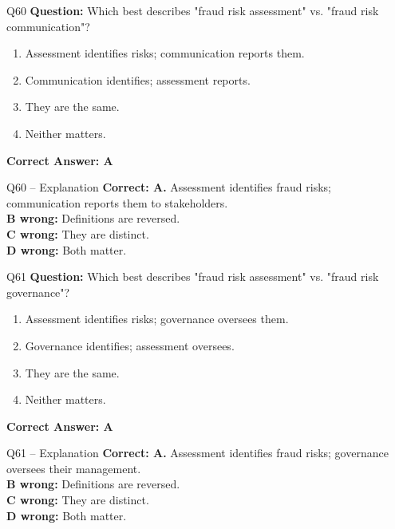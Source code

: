 \documentclass[aspectratio=169,10pt]{beamer}
\begin{document}
	\begin{frame}[t]{Q60}
		\small
		\textbf{Question:} Which best describes "fraud risk assessment" vs. "fraud risk communication"?
		\begin{enumerate}[label=\Alph*.,itemsep=1pt,topsep=2pt]
			\item Assessment identifies risks; communication reports them.
			\item Communication identifies; assessment reports.
			\item They are the same.
			\item Neither matters.
		\end{enumerate}
		\vspace{4pt}
		\textbf{Correct Answer: A}
	\end{frame}
	
	\begin{frame}[t]{Q60 -- Explanation}
		\small
		\textbf{Correct: A.} Assessment identifies fraud risks; communication reports them to stakeholders. \\[4pt]
		\textbf{B wrong:} Definitions are reversed. \\[2pt]
		\textbf{C wrong:} They are distinct. \\[2pt]
		\textbf{D wrong:} Both matter.
	\end{frame}
	
	\begin{frame}[t]{Q61}
		\small
		\textbf{Question:} Which best describes "fraud risk assessment" vs. "fraud risk governance"?
		\begin{enumerate}[label=\Alph*.,itemsep=1pt,topsep=2pt]
			\item Assessment identifies risks; governance oversees them.
			\item Governance identifies; assessment oversees.
			\item They are the same.
			\item Neither matters.
		\end{enumerate}
		\vspace{4pt}
		\textbf{Correct Answer: A}
	\end{frame}
	
	\begin{frame}[t]{Q61 -- Explanation}
		\small
		\textbf{Correct: A.} Assessment identifies fraud risks; governance oversees their management. \\[4pt]
		\textbf{B wrong:} Definitions are reversed. \\[2pt]
		\textbf{C wrong:} They are distinct. \\[2pt]
		\textbf{D wrong:} Both matter.
	\end{frame}
	
\end{document}
